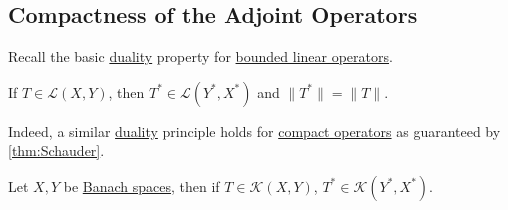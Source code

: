 \subsection{Compactness of the Adjoint Operators}
Recall the basic \hyperref[def:dual-space]{duality} property for \hyperref[def:bounded-linear-op]{bounded linear operators}.

\begin{prev}
	If \(T\in \mathcal{L} (X, Y)\), then \(T^{\ast} \in \mathcal{L} (Y^{\ast} , X^{\ast} )\) and \(\lVert T^{\ast}  \rVert = \lVert T \rVert \).
\end{prev}

Indeed, a similar \hyperref[def:dual-space]{duality} principle holds for \hyperref[def:compact-op]{compact operators} as guaranteed by \autoref{thm:Schauder}.

\begin{theorem}\label{thm:Schauder}
	Let \(X, Y\) be \hyperref[def:Banach-space]{Banach spaces}, then if \(T\in \mathcal{K}(X, Y)\), \(T^{\ast} \in \mathcal{K}(Y^{\ast} , X^{\ast} )\).
\end{theorem}
